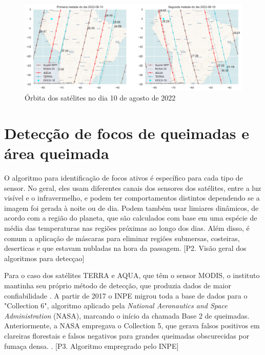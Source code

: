 \documentclass[cic,tc]{iiufrgs}
\begin{document}
\begin{figure}[H]
    \caption{Órbita dos satélites no dia 10 de agosto de 2022}
    \begin{center}
        \includegraphics[width=35em]{orbita2022-08-10}
    \end{center}
    \label{fig:orbita2022-08-10}
\end{figure}

\section{Detecção de focos de queimadas e área queimada}

O algoritmo para identificação de focos ativos é específico para cada tipo 
de sensor. No geral, eles usam diferentes canais dos sensores dos 
satélites, entre a luz visível e o infravermelho, e podem ter comportamentos 
distintos dependendo se a imagem foi gerada à noite ou de dia. Podem também 
usar limiares dinâmicos, de acordo com a região do planeta, que são calculados com 
base em uma espécie de média das temperaturas nas regiões próximas ao longo dos 
dias. Além disso, é comum a aplicação de máscaras para eliminar regiões submersas, 
costeiras, deserticas e que estavam nubladas na hora da passagem. 
[P2. Visão geral dos algoritmos para detecçao] \par

Para o caso dos satélites TERRA e AQUA, que têm o sensor MODIS, o 
instituto mantinha seu próprio método de detecção, que produzia dados de 
maior confiabilidade \citep{PerguntasFrequentesINPE}. 
A partir de 2017 o INPE migrou toda a base de dados para o "Collection 6", 
algoritmo aplicado pela \textit{National Aeronautics and Space Administration} 
(NASA), marcando o início da chamada Base 2 de queimadas. Anteriormente, a NASA 
empregava o Collection 5, que gerava falsos positivos em clareiras florestais e 
falsos negativos para grandes queimadas obscurecidas por fumaça densa.
\citep{SCHROEDER2008}. [P3. Algoritmo empregrado pelo INPE] \par
\end{document}
